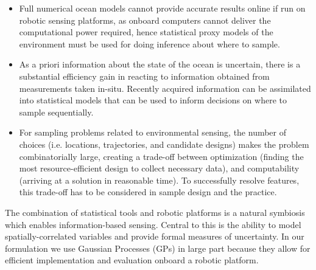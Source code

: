 \documentclass[aoas]{imsart}
\begin{document}
\begin{itemize}

\item Full numerical ocean models cannot provide accurate results
  online if run on robotic sensing platforms, as onboard computers
  cannot deliver the computational power required, hence statistical
  proxy models of the environment must be used for doing inference
  about where to sample.

\item As a priori information about the state of the ocean is
  uncertain, there is a substantial efficiency gain in reacting to
  information obtained from measurements taken in-situ. Recently
  acquired information can be assimilated into statistical models that
  can be used to inform decisions on where to sample
  sequentially.%

\item For sampling problems related to environmental sensing, the
  number of choices (i.e. locations, trajectories, and candidate
  designs) makes the problem combinatorially large, creating a
  trade-off between optimization (finding the most resource-efficient
  design to collect necessary data), and computability (arriving at a
  solution in reasonable time). To successfully resolve features, this
  trade-off has to be considered in sample design and the practice.

\end{itemize}

The combination of statistical tools and robotic platforms is a
natural symbiosis which enables information-based sensing. Central to
this is the ability to model spatially-correlated variables and
provide formal measures of uncertainty. In our formulation we use
Gaussian Processes (GPs) in large part because they allow for
efficient implementation and evaluation onboard a robotic platform.


\end{document}
